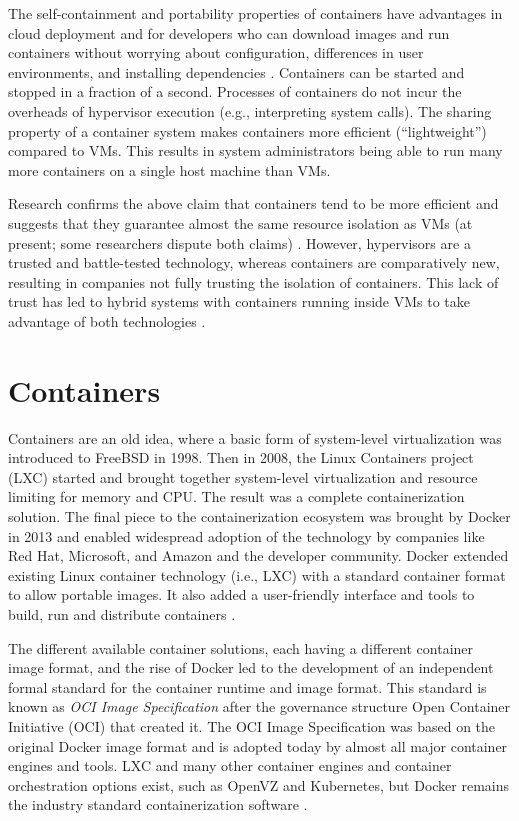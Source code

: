 The self-containment and portability properties of containers have advantages in cloud deployment and for developers who can download images and run containers without worrying about configuration, differences in user environments, and installing dependencies \cite{Mouat99117185791205503}. Containers can be started and stopped in a fraction of a second. Processes of containers do not incur the overheads of hypervisor execution (e.g., interpreting system calls). The sharing property of a container system makes containers more efficient (``lightweight'') compared to VMs. This results in system administrators being able to run many more containers on a single host machine than VMs. 

Research confirms the above claim that containers tend to be more efficient and suggests that they guarantee almost the same resource isolation as VMs (at present; some researchers dispute both claims) \cite{Soltesz2007}. However, hypervisors are a trusted and battle-tested technology, whereas containers are comparatively new, resulting in companies not fully trusting the isolation of containers. This lack of trust has led to hybrid systems with containers running inside VMs to take advantage of both technologies \cite{Mouat99117185791205503}. 

\section{Containers}
Containers are an old idea, where a basic form of system-level virtualization was introduced to FreeBSD in 1998. Then in 2008, the Linux Containers project (LXC) started and brought together system-level virtualization and resource limiting for memory and CPU. The result was a complete containerization solution. The final piece to the containerization ecosystem was brought by Docker in 2013 and enabled widespread adoption of the technology by companies like Red Hat, Microsoft, and Amazon and the developer community. Docker extended existing Linux container technology (i.e., LXC) with a standard container format to allow portable images. It also added a user-friendly interface and tools to build, run and distribute containers \cite{Mouat99117185791205503}. 

The different available container solutions, each having a different container image format, and the rise of Docker led to the development of an independent formal standard for the container runtime and image format. This standard is known as \emph{OCI Image Specification} after the governance structure Open Container Initiative (OCI) that created it. The OCI Image Specification was based on the original Docker image format and is adopted today by almost all major container engines and tools. LXC and many other container engines and container orchestration options exist, such as OpenVZ and Kubernetes, but Docker remains the industry standard containerization software \cite{Mouat99117185791205503}. 

